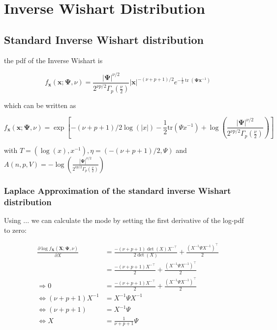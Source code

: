 
\section{Inverse Wishart Distribution}

\subsection{Standard Inverse Wishart distribution}

the pdf of the Inverse Wishart is

\begin{equation}
f_{\mathbf x}({\mathbf x}; {\mathbf \Psi}, \nu) = \frac{\left|{\mathbf\Psi}\right|^{\nu/2}}{2^{\nu p/2}\Gamma_p(\frac \nu 2)} \left|\mathbf{x}\right|^{-(\nu+p+1)/2} e^{-\frac{1}{2}\operatorname{tr}(\mathbf\Psi\mathbf{x}^{-1})}
\label{eq:inverse_wishart_pdf}
\end{equation}

which can be written as

\begin{equation}
f_{\mathbf x}({\mathbf x}; {\mathbf \Psi}, \nu) = \exp \left[-(\nu + p + 1)/2 \log(|x|) - \frac{1}{2} \text{tr}(\Psi x^{-1}) + \log(\frac{\left|{\mathbf\Psi}\right|^{\nu/2}}{2^{\nu p/2}\Gamma_p(\frac \nu 2)}) \right]
\end{equation}

with $T=(\log(x), x^{-1}), \eta=(-(\nu+p+1)/2, \Psi)$ and $A(n,p,V)=- \log(\frac{\left|{\mathbf\Psi}\right|^{\nu/2}}{2^{\nu p/2}\Gamma_p(\frac \nu 2)})$

\subsubsection{Laplace Approximation of the standard inverse Wishart distribution}

Using ... we can calculate the mode by setting the first derivative of the log-pdf to zero:

\begin{align*}
	\frac{\partial \log f_{\mathbf X}({\mathbf X}; {\mathbf \Psi}, \nu)}{\partial X} &= \frac{-(\nu + p + 1) \det(X) X^{-\top}}{2\det(X)} + \frac{(X^{-1} \Psi X^{-1})^\top}{2} \\
	&=\frac{-(\nu + p + 1) X^{-\top}}{2} + \frac{(X^{-1} \Psi X^{-1})^\top}{2} \\
	\Rightarrow 0 &=\frac{-(\nu + p + 1) X^{-\top}}{2} + \frac{(X^{-1} \Psi X^{-1})^\top}{2} \\
	\Leftrightarrow (\nu + p + 1) X^{-1} &= X^{-1} \Psi X^{-1} \\
	\Leftrightarrow (\nu + p + 1) &= X^{-1} \Psi\\
	\Leftrightarrow X &= \frac{1}{\nu + p + 1} \Psi
\end{align*}

